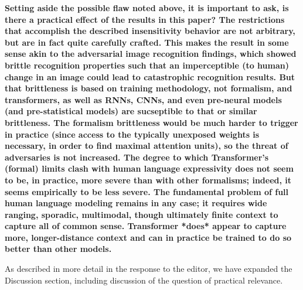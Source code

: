 \documentclass[11pt,a4paper]{article}
\newcommand\response[1]{{\color{blue}#1}}
\newcommand\original[1]{\textbf{#1}}
\begin{document}


\original{Setting aside the possible flaw noted above, it is important to ask, is
there a practical effect of the results in this paper? The
restrictions that accomplish the described insensitivity behavior are
not arbitrary, but are in fact quite carefully crafted. This makes the
result in some sense akin to the adversarial image recognition
findings, which showed brittle recognition properties such that an
imperceptible (to human) change in an image could lead to
catastrophic recognition results. But that brittleness is based on
training methodology, not formalism, and transformers, as well as
RNNs, CNNs, and even pre-neural models (and pre-statistical models)
are sucseptible to that or similar brittleness. The formalism
brittleness would be much harder to trigger in practice (since access
to the typically unexposed weights is necessary, in order to find
maximal attention units), so the threat
of adversaries is not increased. The degree to which Transformer's
(formal) limits clash with human language expressivity does not seem
to be, in practice, more severe than with other formalisms; indeed, it
seems empirically to be less severe. The fundamental problem of full
human language modeling remains in any case; it requires wide ranging,
sporadic, multimodal, though ultimately finite context to capture all
of common sense. Transformer *does* appear to capture more,
longer-distance context and can in practice be trained to do so better
than other models.}

\response{As described in more detail in the response to the editor, we have expanded the Discussion section, including discussion of the question of practical relevance.}
\end{document}
